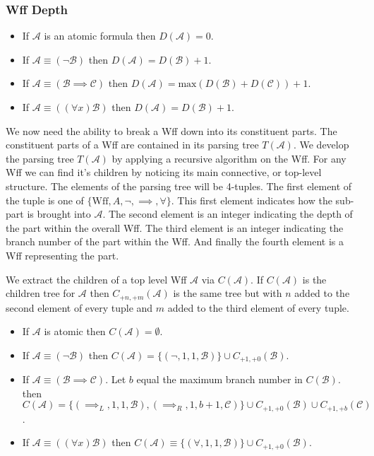 \documentclass[12pt]{article}
\newcommand{\mc}[1]{\mathcal{#1}}
\begin{document}
\subsubsection*{Wff Depth}

\begin{itemize}
\item{If $\mc{A}$ is an atomic formula then $D(\mc{A}) = 0$.}
\item{If $\mc{A} \equiv (\lnot \mc{B})$ then $D(\mc{A}) = D(\mc{B}) + 1$.}
\item{If $\mc{A} \equiv (\mc{B} \implies \mc{C})$ then $D(\mc{A}) = \text{max}(D(\mc{B}) + D(\mc{C})) + 1$.}
\item{If $\mc{A} \equiv ((\forall x) \mc{B})$ then $D(\mc{A}) = D(\mc{B}) + 1$.}
\end{itemize}
\hrulefill

We now need the ability to break a Wff down into its constituent parts.
The constituent parts of a Wff are contained in its parsing tree $T(\mc{A})$.
We develop the parsing tree $T(\mc{A})$ by applying a recursive algorithm on the Wff. 
For any Wff we can find it's children by noticing its main connective, or top-level structure.
The elements of the parsing tree will be 4-tuples.
The first element of the tuple is one of $\{\text{Wff}, A, \lnot, \implies, \forall\}$.
This first element indicates how the sub-part is brought into $\mc{A}$. 
The second element is an integer indicating the depth of the part within the overall Wff.
The third element is an integer indicating the branch number of the part within the Wff.
And finally the fourth element is a Wff representing the part.

We extract the children of a top level Wff $\mc{A}$ via $C(\mc{A})$.
If $C(\mc{A})$ is the children tree for $\mc{A}$ then $C_{+n, +m}(\mc{A})$ is the same tree but with $n$ added to the second element of every tuple and $m$ added to the third element of every tuple.


\hrulefill
\begin{itemize}
\item{If $\mc{A}$ is atomic then $C(\mc{A}) = \emptyset$.}
\item{If $\mc{A} \equiv (\lnot \mc{B})$ then $C(\mc{A}) = \{(\lnot, 1, 1, \mc{B})\} \cup C_{+1, +0}(\mc{B})$.}
\item{If $\mc{A} \equiv (\mc{B} \implies \mc{C})$. Let $b$ equal the maximum branch number in $C(\mc{B})$. then $C(\mc{A}) = \{(\implies_L, 1, 1, \mc{B}), (\implies_R, 1, b+1, \mc{C})\} \cup C_{+1, +0}(\mc{B}) \cup C_{+1, +b}(\mc{C})$.}
\item{If $\mc{A} \equiv ((\forall x)\mc{B})$ then $C(\mc{A}) \equiv \{(\forall, 1, 1, \mc{B})\} \cup C_{+1, +0}(\mc{B})$.}
\end{itemize}
\hrulefill
\end{document}
